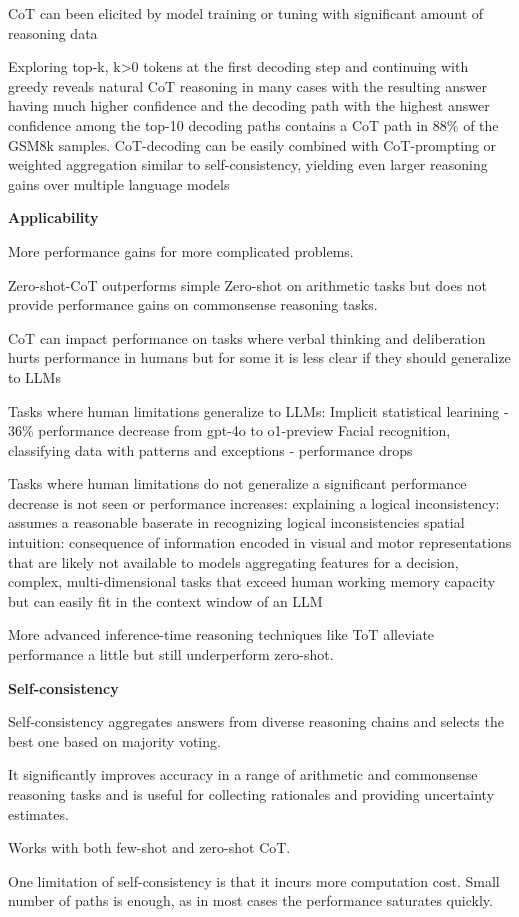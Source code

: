 CoT can been elicited by model training or tuning with significant amount of reasoning data \cite{wang2024chainofthoughtreasoningprompting}

Exploring top-k, k>0 tokens at the first decoding step and continuing with greedy reveals natural CoT reasoning in many cases 
with the resulting answer having much higher confidence and the decoding path with the highest answer confidence 
among the top-10 decoding paths contains a CoT path in 88\% of the GSM8k samples. CoT-decoding can be easily combined with 
CoT-prompting or weighted aggregation similar to self-consistency, yielding even larger reasoning gains over multiple language models \cite{wang2024chainofthoughtreasoningprompting}


\textbf{Applicability}

More performance gains for more complicated problems. \cite{wei2023chainofthoughtpromptingelicitsreasoning}

Zero-shot-CoT outperforms simple Zero-shot on arithmetic tasks but does not provide performance gains on commonsense reasoning tasks. \cite{NEURIPS2022_8bb0d291}

CoT can impact performance on tasks where verbal thinking and deliberation hurts performance in humans but for some
it is less clear if they should generalize to LLMs \cite{liu2024mindstepbystep}

Tasks where human limitations generalize to LLMs:
Implicit statistical learining - 36\% performance decrease from gpt-4o to o1-preview
Facial recognition, classifying data with patterns and exceptions - performance drops \cite{liu2024mindstepbystep}

Tasks where human limitations do not generalize a significant performance decrease is not seen or performance increases:
explaining a logical inconsistency:  assumes a reasonable baserate in recognizing logical inconsistencies
spatial intuition: consequence of information encoded in visual and motor representations that are likely not available to models 
aggregating features for a decision, complex, multi-dimensional tasks that exceed human working memory capacity but can easily fit in the context window of an LLM \cite{liu2024mindstepbystep}

More advanced inference-time reasoning techniques like ToT alleviate performance a little but still underperform zero-shot. \cite{liu2024mindstepbystep}

\textbf{Self-consistency}

Self-consistency aggregates answers from diverse reasoning chains and selects the best one based on majority voting. \cite{wang2023selfconsistencyimproveschainthought}

It significantly improves accuracy in a range of arithmetic and commonsense reasoning tasks and is useful for collecting rationales and providing uncertainty estimates. \cite{wang2023selfconsistencyimproveschainthought}

Works with both few-shot and zero-shot CoT. \cite{wang2023selfconsistencyimproveschainthought}

One limitation of self-consistency is that it incurs more computation cost. Small number of paths is enough, as in most cases the performance saturates quickly. \cite{wang2023selfconsistencyimproveschainthought}
